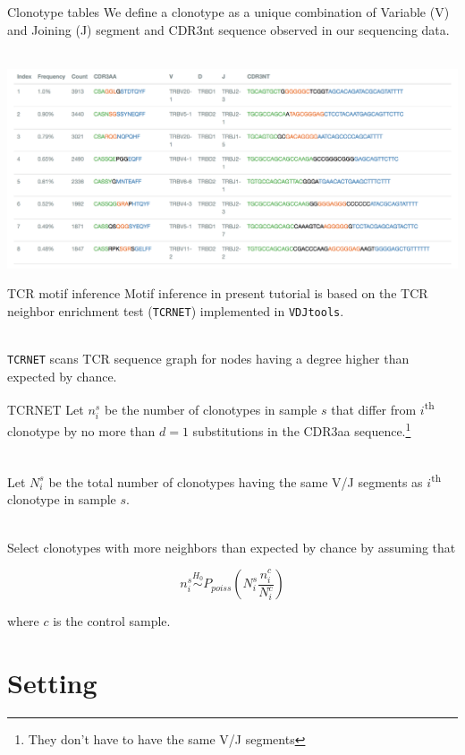 \documentclass[12pt]{beamer}
\begin{document}
\begin{frame}{Clonotype tables}
We define a clonotype as a unique combination of Variable (V) and Joining (J) segment and CDR3nt sequence observed in our sequencing data.\\~\

\includegraphics[width=\textwidth]{clonotype_table}
\end{frame}

\begin{frame}{TCR motif inference}
Motif inference in present tutorial is based on the TCR neighbor enrichment test (\texttt{TCRNET}) implemented in \texttt{VDJtools}.\\~\

\texttt{TCRNET} scans TCR sequence graph for nodes having a degree higher than expected by chance.
\end{frame}

\begin{frame}{TCRNET}
Let $n_i^s$ be the number of clonotypes in sample $s$ that differ from $i$\textsuperscript{th} clonotype by no more than $d=1$ substitutions in the CDR3aa sequence.\footnote{They don't have to have the same V/J segments}\\~\

Let $N_i^s$ be the total number of clonotypes having the same V/J segments as $i$\textsuperscript{th} clonotype in sample $s$.\\~\

Select clonotypes with more neighbors than expected by chance by assuming that

\begin{equation}
n_i^s\stackrel{H_0}{\sim} P_{poiss}\left(N_i^s\frac{n_i^c}{N_i^c}\right)
\end{equation}

where $c$ is the control sample.
\end{frame}

\section{Setting}
\end{document}
